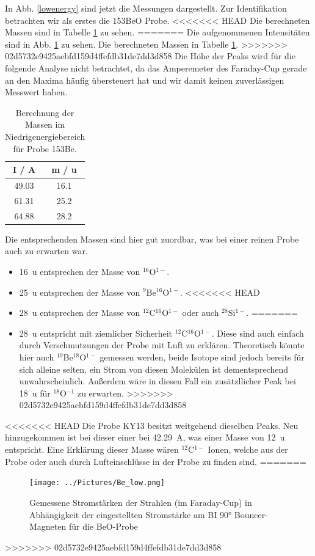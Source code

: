 In Abb. \ref{lowenergy} sind jetzt die Messungen dargestellt.
Zur Identifikation betrachten wir als erstes die 153BeO Probe.
<<<<<<< HEAD
Die berechneten Massen sind in Tabelle \ref{153Be} zu sehen.
=======
Die aufgenommenen Intensitäten sind in Abb. \ref{Probe_Be} zu sehen.
Die berechneten Massen in Tabelle \ref{153Be}.
>>>>>>> 02d5732e9425aebfd159d4ffefdb31de7dd3d858
Die Höhe der Peaks wird für die folgende Analyse nicht betrachtet, da das Amperemeter des Faraday-Cup gerade an den Maxima häufig übersteuert hat und wir damit keinen zuverlässigen Messwert haben.
\begin{table}[h]
    \centering
    \caption{Berechnung der Massen im Niedrigenergiebereich für Probe 153Be.}
    \begin{tabular}{|c |c|}
        \hline
        I / \si{\ampere} & m / \si{\atomicmassunit} \\
        \hline
        \num{49.03} & \num{16.1} \\
        \num{61.31} & \num{25.2} \\
        \num{64.88} & \num{28.2} \\
        \hline
    \end{tabular}
    \label{153Be}
\end{table}
Die entsprechenden Massen sind hier gut zuordbar, was bei einer reinen Probe auch zu erwarten war.
\begin{itemize}
    \item \SI{16}{\atomicmassunit} entsprechen der Masse von $^{16}$O$^{1-}$.
    \item \SI{25}{\atomicmassunit} entsprechen der Masse von $^{9}$Be$^{16}$O$^{1-}$.
<<<<<<< HEAD
    \item \SI{28}{\atomicmassunit} entsprechen der Masse von $^{12}$C$^{16}$O$^{1-}$ oder auch $^{28}$Si$^{1-}$.
=======
    \item \SI{28}{\atomicmassunit} entspricht mit ziemlicher Sicherheit $^{12}$C$^{16}$O$^{1-}$.
Diese sind auch einfach durch Verschmutzungen der Probe mit Luft zu erklären.
Theoretisch könnte hier auch $^{10}$Be$^{18}$O$^{1-}$ gemessen werden, beide Isotope sind jedoch bereits für sich alleine selten, ein Strom von diesen Molekülen ist dementsprechend unwahrscheinlich.
Außerdem wäre in diesen Fall ein zusätzllicher Peak bei \SI{18}{\atomicmassunit} für $^{18}$O$^{-1}$ zu erwarten.
>>>>>>> 02d5732e9425aebfd159d4ffefdb31de7dd3d858
\end{itemize}

<<<<<<< HEAD
Die Probe KY13 besitzt weitgehend dieselben Peaks.
Neu hinzugekommen ist bei dieser einer bei \SI{42.29}{\ampere}, was einer Masse von \SI{12}{\atomicmassunit} entspricht.
Eine Erklärung dieser Masse wären $^{12}$C$^{1-}$ Ionen, welche aus der Probe oder auch durch Lufteinschlüsse in der Probe zu finden sind.
=======
\begin{figure}[ht]
	\centering
           \texttt{[image: ../Pictures/Be\_low.png]}
	\caption{Gemessene Stromstärken der Strahlen (im Faraday-Cup) in Abhängigkeit der eingestellten Stromstärke am BI \ang{90} Bouncer-Magneten für die BeO-Probe}
	\label{Probe_Be}
\end{figure}
>>>>>>> 02d5732e9425aebfd159d4ffefdb31de7dd3d858


